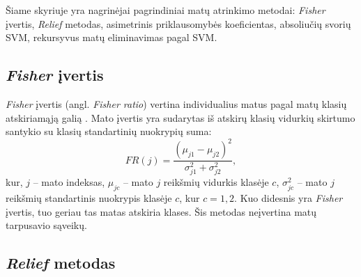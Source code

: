 Šiame skyriuje yra nagrinėjai pagrindiniai matų atrinkimo metodai: \textit{Fisher} įvertis, \textit{Relief} metodas, asimetrinis priklausomybės koeficientas, absoliučių svorių SVM, rekursyvus matų eliminavimas pagal SVM.

\subsection{\textit{Fisher} įvertis}

\textit{Fisher} įvertis (angl. \textit{Fisher ratio}) vertina individualius matus pagal matų klasių atskiriamąją galią \cite{Pavlidis:2001:GFC:369133.369228}. Mato įvertis yra sudarytas iš atskirų klasių vidurkių skirtumo santykio su klasių standartinių nuokrypių suma:
\begin{equation}
 FR(j) = \frac{(\mu_{j1} - \mu_{j2})^2}{\sigma_{j1}^2 + \sigma_{j2}^2},
\end{equation}
kur, 
$j$ -- mato indeksas, 
$\mu_{jc}$ -- mato $j$ reikšmių vidurkis klasėje $c$, 
$\sigma_{jc}^2$ -- mato $j$ reikšmių standartinis nuokrypis klasėje $c$, kur $c={1,2}$. Kuo didesnis yra \textit{Fisher} įvertis, tuo geriau tas matas atskiria klases. Šis metodas neįvertina matų tarpusavio sąveikų.

\subsection{\textit{Relief} metodas}

